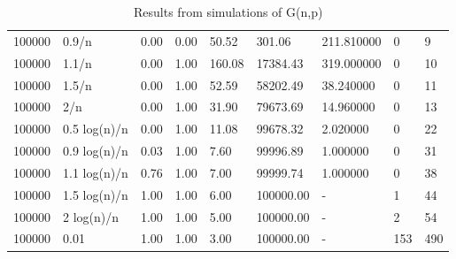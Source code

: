 \begin{table}[ht!]
\begin{tabular}{l|l|l|l|l|l|l|l|l}
	100000 &         0.9/n &       0.00 &   0.00 &     50.52 &     301.06 &  211.810000 &       0 &       9 \\
	100000 &         1.1/n &       0.00 &   1.00 &    160.08 &   17384.43 &  319.000000 &       0 &      10 \\
	100000 &         1.5/n &       0.00 &   1.00 &     52.59 &   58202.49 &   38.240000 &       0 &      11 \\
	100000 &           2/n &       0.00 &   1.00 &     31.90 &   79673.69 &   14.960000 &       0 &      13 \\
	100000 &  0.5 log(n)/n &       0.00 &   1.00 &     11.08 &   99678.32 &    2.020000 &       0 &      22 \\
	100000 &  0.9 log(n)/n &       0.03 &   1.00 &      7.60 &   99996.89 &    1.000000 &       0 &      31 \\
	100000 &  1.1 log(n)/n &       0.76 &   1.00 &      7.00 &   99999.74 &    1.000000 &       0 &      38 \\
	100000 &  1.5 log(n)/n &       1.00 &   1.00 &      6.00 &  100000.00 &         - &       1 &      44 \\
	100000 &    2 log(n)/n &       1.00 &   1.00 &      5.00 &  100000.00 &         - &       2 &      54 \\
	100000 &          0.01 &       1.00 &   1.00 &      3.00 &  100000.00 &         - &     153 &     490 \\
	\bottomrule
\end{tabular}
\caption{Results from simulations of G(n,p)}
\label{t:gnp}
\end{table}